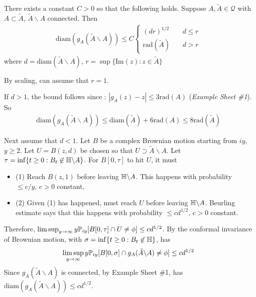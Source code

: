 \documentclass[12pt,a4paper]{article}
\newenvironment{proof}
{\begin{changemargin}{0.5cm}{0.5cm} 
	}%
	{\end{changemargin}
}
\renewenvironment{i}
{\begin{itemize} 
	}%
	{\end{itemize}
}
\newenvironment{p}
{\begin{proof} 
	}%
	{\end{proof}
}
\begin{document}
\prop There exists a constant $C>0$ so that the following holds. Suppose $A, \tilde{A} \in \mathscr{Q}$ with $A\subset \tilde{A}$, $\tilde{A}\backslash A$ connected. Then
\begin{align*}
\text{diam}(g_A(\tilde{A}\backslash A))\leq C \begin{cases}
(dr)^{1/2} & \quad d\leq r \\
\text{rad}(\tilde{A}) & \quad d>r
\end{cases}
\end{align*}
where $d = \text{diam}(\tilde{A} \backslash A)$, $r =\sup \{\text{Im}(z) : z \in \tilde{A} \}$
\begin{p}
\pf By scaling, can assume that $r=1$.

\quad If $d>1$, the bound follows since : $|g_A(z)-z| \leq 3\text{rad}(A)$ (\emph{Example Sheet \#1}). So
\begin{align*}
\text{diam}(g_A(\tilde{A}\backslash A)) \leq \text{diam}(\tilde{A}) + 6 \text{rad}(A) \leq 8 \text{rad}(\tilde{A})
\end{align*}

\quad Next assume that $d<1$. Let $B$ be a complex Brownian motion starting from $iy$, $y\geq 2$. Let $U =B(z,d)$ be chosen so that $U \supset \tilde{A} \backslash A$. Let $\tau = \inf \{t\geq 0: B_t \not\in \mathbb{H} \backslash A \}$. For $B[0, \tau]$ to hit $U$, it must 
\begin{i}
\item[(1)] Reach $B(z,1)$ before leaving $\mathbb{H} \backslash A$. This happens with probability $\leq c/y$, $c>0$ constant,
\item[(2)] Given (1) has happened, must reach $U$ before leaving $\mathbb{H}\backslash A$. Beurling estimate says that this happens with probability $\leq cd^{1/2}$, $c>0$ constant.
\end{i}
Therefore, $\limsup_{y\rightarrow \infty} y \mathbb{P}_{iy} [B[0, \tau] \cap U \neq \phi] \leq cd^{1/2}$. By the conformal invariance of Brownian motion, with $\sigma = \inf\{t\geq 0 : B_t \not\in \mathbb{H} \}$, has
\begin{align*}
\limsup_{y\rightarrow \infty} y\mathbb{P}_{iy} [B[0, \sigma] \cap g_A(\tilde{A}\backslash A) \neq \phi]\leq cd^{1/2}
\end{align*}
Since $g_A(\tilde{A} \backslash A)$ is connected, by Example Sheet \#1, has $\text{diam}(g_A(\tilde{A} \backslash A))\leq cd^{1/2}$.

\eop
\end{p}
\s
\end{document}
